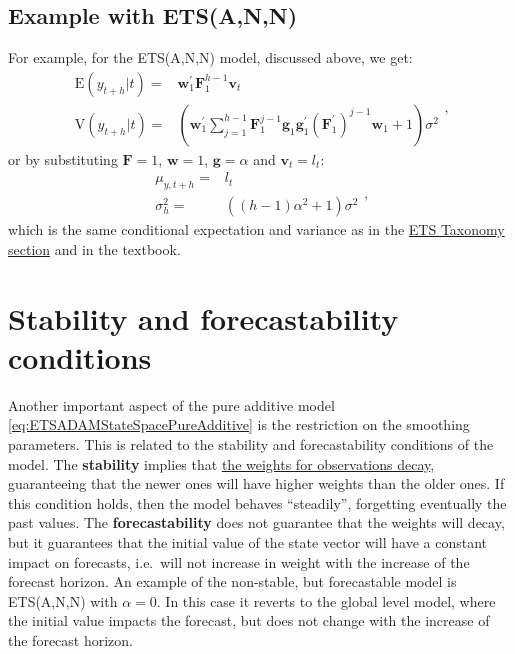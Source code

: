 \documentclass[
]{book}
\theoremstyle{definition}
\theoremstyle{definition}
\theoremstyle{definition}
\theoremstyle{definition}
\theoremstyle{remark}
\begin{document}
\hypertarget{example-with-etsann}{%
\subsection{Example with ETS(A,N,N)}\label{example-with-etsann}}

For example, for the ETS(A,N,N) model, discussed above, we get:
\begin{equation}
  \begin{aligned}
    \text{E}(y_{t+h}|t) = & \mathbf{w}_{1}^\prime \mathbf{F}_{1}^{h-1} \mathbf{v}_{t} \\
    \text{V}(y_{t+h}|t) = & \left(\mathbf{w}_{1}^\prime \sum_{j=1}^{h-1} \mathbf{F}_{1}^{j-1} \mathbf{g}_{1} \mathbf{g}^\prime_{1} (\mathbf{F}_{1}^\prime)^{j-1} \mathbf{w}_{1} + 1 \right) \sigma^2
  \end{aligned},
  \label{eq:ETSADAMStateSpaceANNRecursionMeanAndVarianceGeneral}
\end{equation}
or by substituting \(\mathbf{F}=1\), \(\mathbf{w}=1\), \(\mathbf{g}=\alpha\) and \(\mathbf{v}_t=l_t\):
\begin{equation}
  \begin{aligned}
    \mu_{y,t+h} = & l_{t} \\
    \sigma^2_{h} = & \left((h-1) \alpha^2 + 1 \right) \sigma^2
  \end{aligned},
  \label{eq:ETSADAMStateSpaceANNRecursionMeanAndVariance}
\end{equation}
which is the same conditional expectation and variance as in the \protect\hyperlink{ETSTaxonomyMaths}{ETS Taxonomy section} and in the \citet{Hyndman2008b} textbook.

\hypertarget{stabilityConditionAdditiveError}{%
\section{Stability and forecastability conditions}\label{stabilityConditionAdditiveError}}

Another important aspect of the pure additive model \eqref{eq:ETSADAMStateSpacePureAdditive} is the restriction on the smoothing parameters. This is related to the stability and forecastability conditions of the model. The \textbf{stability} implies that \protect\hyperlink{whyExponential}{the weights for observations decay}, guaranteeing that the newer ones will have higher weights than the older ones. If this condition holds, then the model behaves ``steadily'', forgetting eventually the past values. The \textbf{forecastability} does not guarantee that the weights will decay, but it guarantees that the initial value of the state vector will have a constant impact on forecasts, i.e.~will not increase in weight with the increase of the forecast horizon. An example of the non-stable, but forecastable model is ETS(A,N,N) with \(\alpha=0\). In this case it reverts to the global level model, where the initial value impacts the forecast, but does not change with the increase of the forecast horizon.
\end{document}
